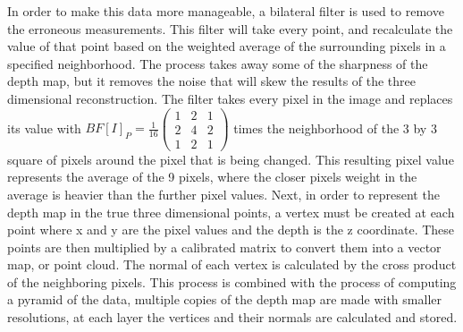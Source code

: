 \documentclass[12pt,twocolumn]{article}
\begin{document}
\indent In order to make this data more manageable, a bilateral filter is used to remove the erroneous measurements. This filter will take every point, and recalculate the value of that point based on the weighted average of the surrounding pixels in a specified neighborhood. The process takes away some of the sharpness of the depth map, but it removes the noise that will skew the results of the three dimensional reconstruction. The filter takes every pixel in the image and replaces its value with $BF[I]_{P} = \frac{1}{16} \left( \begin{array}{ccc}
1 & 2 & 1 \\
2 & 4 & 2 \\
1 & 2 & 1 \end{array}  \right) $ times the neighborhood of the 3 by 3 square of pixels around the pixel that is being changed. This resulting pixel value represents the average of the 9 pixels, where the closer pixels weight in the average is heavier than the further pixel values. Next, in order to represent the depth map in the true three dimensional points, a vertex must be created at each point where x and y are the pixel values and the depth is the z coordinate. These points are then multiplied by a calibrated matrix to convert them into a vector map, or point cloud. The normal of each vertex is calculated by the cross product of the neighboring pixels. This process is combined with the process of computing a pyramid of the data, multiple copies of the depth map are made with smaller resolutions, at each layer the vertices and their normals are calculated and stored. 
\end{document}
